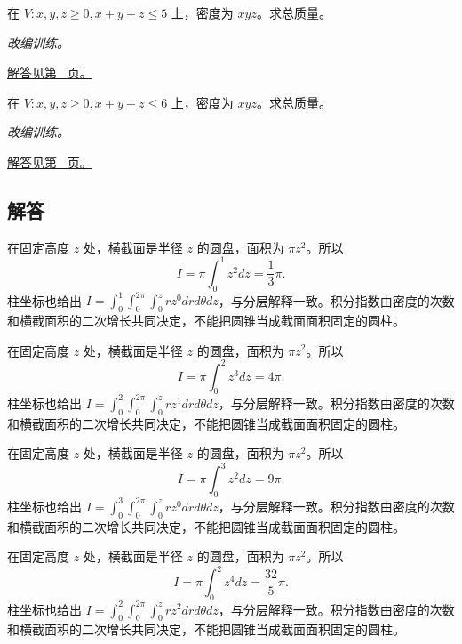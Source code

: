 \documentclass[12pt,fontset=fandol]{ctexart}
\begin{document}
\begin{example}[单纯形上的乘积密度]\label{ex:c39q23}
在 $V:x,y,z\ge0, x+y+z\le 5$ 上，密度为 $xyz$。求总质量。
\par\textit{改编训练。}\par\hyperref[ans:c39q23]{解答见第~\pageref{ans:c39q23} 页。}
\end{example}
\begin{example}[单纯形上的乘积密度]\label{ex:c39q24}
在 $V:x,y,z\ge0, x+y+z\le 6$ 上，密度为 $xyz$。求总质量。
\par\textit{改编训练。}\par\hyperref[ans:c39q24]{解答见第~\pageref{ans:c39q24} 页。}
\end{example}
\subsection{解答}
\begin{solve}\label{ans:c39q1}
在固定高度 $z$ 处，横截面是半径 $z$ 的圆盘，面积为 $\pi z^2$。所以
\[
I=\pi\int_0^{1}z^{2}dz=\frac{1}{3}\pi.
\]
柱坐标也给出 $I=\int_0^{1}\int_0^{2\pi}\int_0^zr z^{0}drd\theta dz$，与分层解释一致。积分指数由密度的次数和横截面积的二次增长共同决定，不能把圆锥当成截面面积固定的圆柱。
\end{solve}

\begin{solve}\label{ans:c39q2}
在固定高度 $z$ 处，横截面是半径 $z$ 的圆盘，面积为 $\pi z^2$。所以
\[
I=\pi\int_0^{2}z^{3}dz=4\pi.
\]
柱坐标也给出 $I=\int_0^{2}\int_0^{2\pi}\int_0^zr z^{1}drd\theta dz$，与分层解释一致。积分指数由密度的次数和横截面积的二次增长共同决定，不能把圆锥当成截面面积固定的圆柱。
\end{solve}

\begin{solve}\label{ans:c39q3}
在固定高度 $z$ 处，横截面是半径 $z$ 的圆盘，面积为 $\pi z^2$。所以
\[
I=\pi\int_0^{3}z^{2}dz=9\pi.
\]
柱坐标也给出 $I=\int_0^{3}\int_0^{2\pi}\int_0^zr z^{0}drd\theta dz$，与分层解释一致。积分指数由密度的次数和横截面积的二次增长共同决定，不能把圆锥当成截面面积固定的圆柱。
\end{solve}

\begin{solve}\label{ans:c39q4}
在固定高度 $z$ 处，横截面是半径 $z$ 的圆盘，面积为 $\pi z^2$。所以
\[
I=\pi\int_0^{2}z^{4}dz=\frac{32}{5}\pi.
\]
柱坐标也给出 $I=\int_0^{2}\int_0^{2\pi}\int_0^zr z^{2}drd\theta dz$，与分层解释一致。积分指数由密度的次数和横截面积的二次增长共同决定，不能把圆锥当成截面面积固定的圆柱。
\end{solve}
\end{document}

